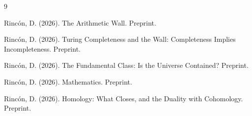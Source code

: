 \documentclass[12pt]{article}
\theoremstyle{definition}
\theoremstyle{remark}
\begin{document}
\begin{thebibliography}{9}

Rinc\'on, D. (2026).
The Arithmetic Wall. Preprint.

Rinc\'on, D. (2026).
Turing Completeness and the Wall:
Completeness Implies Incompleteness. Preprint.

Rinc\'on, D. (2026).
The Fundamental Class: Is the Universe Contained? Preprint.

Rinc\'on, D. (2026).
Mathematics. Preprint.

Rinc\'on, D. (2026).
Homology: What Closes, and the Duality with Cohomology. Preprint.

\end{thebibliography}
\end{document}
